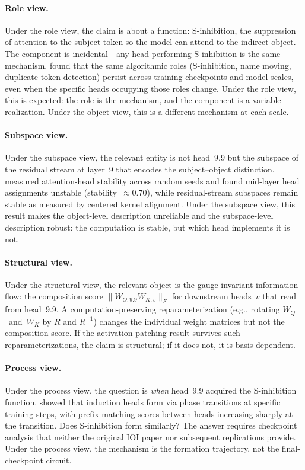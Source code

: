 \documentclass{article}
\begin{document}
\paragraph{Role view.}
Under the role view, the claim is about a function: S-inhibition,
the suppression of attention to the subject token so the model can
attend to the indirect object.  The component is incidental---any head
performing S-inhibition is the same mechanism.
\citet{tigges2024} found that the same algorithmic roles
(S-inhibition, name moving, duplicate-token detection) persist across
training checkpoints and model scales, even when the specific heads
occupying those roles change.  Under the role view, this is expected:
the role is the mechanism, and the component is a variable realization.
Under the object view, this is a different mechanism at each scale.

\paragraph{Subspace view.}
Under the subspace view, the relevant entity is not head~9.9 but the
subspace of the residual stream at layer~9 that encodes the
subject--object distinction.  \citet{bali2026} measured attention-head
stability across random seeds and found mid-layer head assignments
unstable (stability~$\approx$0.70), while residual-stream subspaces
remain stable as measured by centered kernel alignment.
Under the subspace view, this result makes the object-level description
unreliable and the subspace-level description robust: the computation
is stable, but which head implements it is not.

\paragraph{Structural view.}
Under the structural view, the relevant object is the gauge-invariant
information flow: the composition score $\|W_{O,\text{9.9}} W_{K,v}\|_F$
for downstream heads~$v$ that read from head~9.9.
A computation-preserving reparameterization (e.g., rotating
$W_Q$~and~$W_K$ by $R$ and $R^{-1}$) changes the individual weight
matrices but not the composition score.  If the activation-patching
result survives such reparameterizations, the claim is structural;
if it does not, it is basis-dependent.

\paragraph{Process view.}
Under the process view, the question is \emph{when} head~9.9 acquired
the S-inhibition function.  \citet{olsson2022} showed that induction
heads form via phase transitions at specific training steps, with
prefix matching scores between heads increasing sharply at the transition.
Does S-inhibition form similarly?  The answer requires checkpoint
analysis that neither the original IOI paper nor subsequent
replications provide.  Under the process view, the mechanism is
the formation trajectory, not the final-checkpoint circuit.
\end{document}
